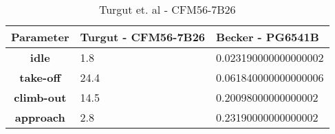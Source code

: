 \begin{table}[h!]
  \centering
  \begin{tabularx}{\textwidth}{||c|X|X||}
  \hline
    \cellcolor{gray!20}\textbf{Parameter} & \cellcolor{gray!20}\textbf{Turgut - CFM56-7B26} & \cellcolor{gray!20}\textbf{Becker - PG6541B} \\ [0.5ex]
  \hline\hline
\centering
    \cellcolor{gray!20}\textbf{idle} & 1.8 & 0.023190000000000002 \\
  \hline
    \cellcolor{gray!20}\textbf{take-off} & 24.4 & 0.061840000000000006 \\
  \hline
    \cellcolor{gray!20}\textbf{climb-out} & 14.5 & 0.20098000000000002 \\
  \hline
    \cellcolor{gray!20}\textbf{approach} & 2.8 & 0.23190000000000002 \\
  \hline
  \end{tabularx}
  \caption{Turgut et. al - CFM56-7B26}
  \label{tab:exp}
\end{table}

